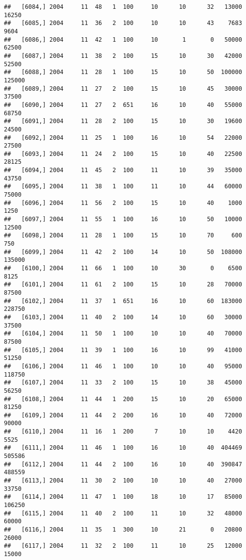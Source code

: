 \documentclass{article}\usepackage[]{graphicx}\usepackage[]{color}
\makeatletter
\newenvironment{kframe}{%
 \def\at@end@of@kframe{}%
 \ifinner\ifhmode%
  \def\at@end@of@kframe{\end{minipage}}%
  \begin{minipage}{\columnwidth}%
 \fi\fi%
 \def\FrameCommand##1{\hskip\@totalleftmargin \hskip-\fboxsep
 \colorbox{shadecolor}{##1}\hskip-\fboxsep
     \hskip-\linewidth \hskip-\@totalleftmargin \hskip\columnwidth}%
 \MakeFramed {\advance\hsize-\width
   \@totalleftmargin\z@ \linewidth\hsize
   \@setminipage}}%
 {\par\unskip\endMakeFramed%
 \at@end@of@kframe}
\newenvironment{knitrout}{}{} %
\makeatother
\begin{document}
\begin{knitrout}
\begin{kframe}
\begin{verbatim}
##   [6084,] 2004     11  48   1  100     10      10      32   13000   16250
##   [6085,] 2004     11  36   2  100     10      10      43    7683    9604
##   [6086,] 2004     11  42   1  100     10       1       0   50000   62500
##   [6087,] 2004     11  38   2  100     15      10      30   42000   52500
##   [6088,] 2004     11  28   1  100     15      10      50  100000  125000
##   [6089,] 2004     11  27   2  100     15      10      45   30000   37500
##   [6090,] 2004     11  27   2  651     16      10      40   55000   68750
##   [6091,] 2004     11  28   2  100     15      10      30   19600   24500
##   [6092,] 2004     11  25   1  100     16      10      54   22000   27500
##   [6093,] 2004     11  24   2  100     15      10      40   22500   28125
##   [6094,] 2004     11  45   2  100     11      10      39   35000   43750
##   [6095,] 2004     11  38   1  100     11      10      44   60000   75000
##   [6096,] 2004     11  56   2  100     15      10      40    1000    1250
##   [6097,] 2004     11  55   1  100     16      10      50   10000   12500
##   [6098,] 2004     11  28   1  100     15      10      70     600     750
##   [6099,] 2004     11  42   2  100     14      10      50  108000  135000
##   [6100,] 2004     11  66   1  100     10      30       0    6500    8125
##   [6101,] 2004     11  61   2  100     15      10      28   70000   87500
##   [6102,] 2004     11  37   1  651     16      10      60  183000  228750
##   [6103,] 2004     11  40   2  100     14      10      60   30000   37500
##   [6104,] 2004     11  50   1  100     10      10      40   70000   87500
##   [6105,] 2004     11  39   1  100     16      10      99   41000   51250
##   [6106,] 2004     11  46   1  100     10      10      40   95000  118750
##   [6107,] 2004     11  33   2  100     15      10      38   45000   56250
##   [6108,] 2004     11  44   1  200     15      10      20   65000   81250
##   [6109,] 2004     11  44   2  200     16      10      40   72000   90000
##   [6110,] 2004     11  16   1  200      7      10      10    4420    5525
##   [6111,] 2004     11  46   1  100     16      10      40  404469  505586
##   [6112,] 2004     11  44   2  100     16      10      40  390847  488559
##   [6113,] 2004     11  30   2  100     10      10      40   27000   33750
##   [6114,] 2004     11  47   1  100     18      10      17   85000  106250
##   [6115,] 2004     11  40   2  100     11      10      32   48000   60000
##   [6116,] 2004     11  35   1  300     10      21       0   20800   26000
##   [6117,] 2004     11  32   2  100     11      10      25   12000   15000

\end{verbatim}
\end{kframe}
\end{knitrout}
\end{document}
